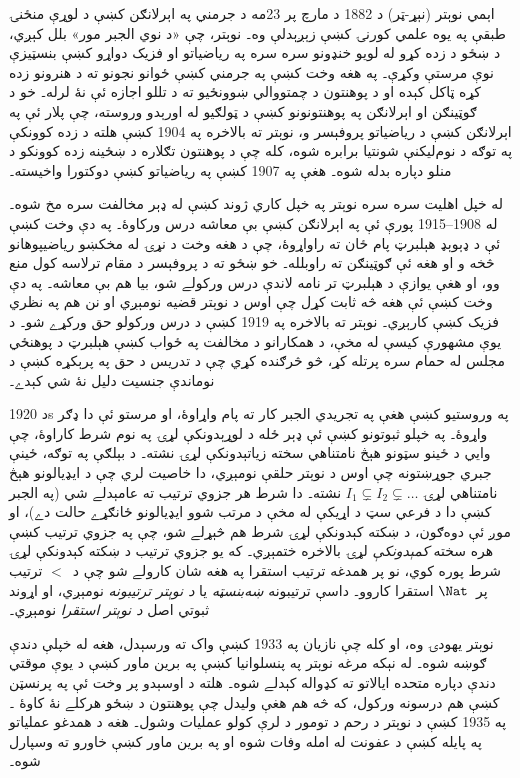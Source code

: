 \documentclass[../../../include/open-logic-section]{subfiles}
\begin{document}



اېمي نوېتر (\textsc{نېړ}-ټر) د 1882 د مارچ پر
23مه د جرمني په اېرلانګن کښې د لوړې منځنۍ
طبقې په يوه علمي کورنۍ کښې زېږېدلې وه۔
نوېتر، چې «د نوي الجبر مور» بلل کېږي، د
ښځو د زده کړو له لويو خنډونو سره سره په
رياضياتو او فزيک دواړو کښې بنسټيزې نوې
مرستې وکړې۔ په هغه وخت کښې په جرمني کښې
ځوانو نجونو ته د هنرونو زده کړه ټاکل کېده
او د پوهنتون د چمتووالي ښوونځيو ته د
تللو اجازه ئې نۀ لرله۔ خو د ګوټينګن او
اېرلانګن په پوهنتونونو کښې د ټولګيو له
اورېدو وروسته، چې پلار ئې په اېرلانګن
کښې د رياضياتو پروفېسر و، نوېتر ته بالاخره
په 1904 کښې هلته د زده کوونکې په توګه
د نوم‌ليکنې شونتيا برابره شوه، کله چې د پوهنتون
تګلاره د ښځينه زده کوونکو د منلو دپاره
بدله شوه۔ هغې په 1907 کښې په رياضياتو
کښې دوکتورا واخيسته۔

له خپل اهليت سره سره نوېتر په خپل کاري
ژوند کښې له ډېر مخالفت سره مخ شوه۔ له
1908--1915 پورې ئې په اېرلانګن کښې بې
معاشه درس ورکاوۀ۔ په دې وخت کښې ئې د
ډېوېډ هېلبرټ پام ځان ته راواړوۀ، چې د
هغه وخت د نړۍ له مخکښو رياضيپوهانو څخه
و او هغه ئې ګوټينګن ته راوبلله۔ خو ښځو
ته د پروفېسر د مقام ترلاسه کول منع وو،
او هغې يوازې د هېلبرټ تر نامه لاندې
درس ورکولے شو، بيا هم بې معاشه۔ په دې
وخت کښې ئې هغه څه ثابت کړل چې اوس د
نوېتر قضيه نومېږي او نن هم په نظري
فزيک کښې کارېږي۔ نوېتر ته بالاخره په
1919 کښې د درس ورکولو حق ورکړے شو۔
د يوې مشهورې کيسې له مخې، د همکارانو د مخالفت په ځواب کښې هېلبرټ د پوهنځي مجلس له حمام سره پرتله کړ، څو څرګنده کړي چې د تدريس د حق په پرېکړه کښې د نوماندې جنسيت دليل نۀ شي کېدے۔

د 1920s په وروستيو کښې هغې په تجريدي الجبر
کار ته پام واړاوۀ، او مرستو ئې دا ډګر
واړوۀ۔ په خپلو ثبوتونو کښې ئې ډېر ځله
د لوړېدونکې لړۍ په نوم شرط کاراوۀ، چې
وايي د ځينو سټونو هېڅ نامتناهي سخته
زياتېدونکې لړۍ نشته۔ د بېلګې په توګه،
ځينې جبري جوړښتونه چې اوس د نوېتر
حلقې نومېږي، دا خاصيت لري چې د ايډيالونو
هېڅ نامتناهي لړۍ $I_1
\subsetneq I_2 \subsetneq \dots$ نشته۔
دا شرط هر جزوي ترتيب ته عامېدلے شي
(په الجبر کښې دا د فرعي سټ د اړيکې
له مخې د مرتب شوو ايډيالونو ځانګړے
حالت دے)، او موږ ئې دوه‌ګون، د
ښکته کېدونکې لړۍ شرط هم څېړلے شو،
چې په جزوي ترتيب کښې هره سخته
\emph{کمېدونکې} لړۍ بالاخره ختمېږي۔
که يو جزوي ترتيب د ښکته کېدونکې لړۍ
شرط پوره کوي، نو پر همدغه ترتيب
استقرا په هغه شان کارولے شو چې
د~$<$ ترتيب پر~$\Nat$ استقرا کاروو۔
داسې ترتيبونه \emph{ښه‌بنسټه} يا
\emph{د نوېتر ترتيبونه} نومېږي، او
اړوند ثبوتي اصل \emph{د نوېتر استقرا}
نومېږي۔

نوېتر يهودۍ وه، او کله چې نازيان په 1933
کښې واک ته ورسېدل، هغه له خپلې دندې
ګوښه شوه۔ له نېکه مرغه نوېتر په
پنسلوانيا کښې په برين ماور کښې د
يوې موقتي دندې دپاره متحده ايالاتو
ته کډواله کېدلے شوه۔ هلته د اوسېدو
پر وخت ئې په پرنسټن کښې هم درسونه
ورکول، که څه هم هغې وليدل چې پوهنتون
د ښځو هرکلے نۀ کاوۀ
\citep[81]{Dick1981}۔ په 1935 کښې
د نوېتر د رحم د تومور د لرې کولو
عمليات وشول۔ هغه د همدغو عملياتو
په پايله کښې د عفونت له امله وفات
شوه او په برين ماور کښې خاورو ته
وسپارل شوه۔
\end{document}

